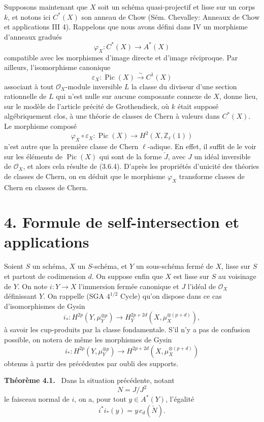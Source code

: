 \documentclass[11pt]{article}
\newenvironment{statement}[1]{\par\medskip\noindent\textbf{#1.}\ }{\par\medskip}
\providecommand{\Pic}{\operatorname{Pic}}
\begin{document}
Supposons maintenant que $X$ soit un schéma quasi-projectif et lisse sur un corps $k$, et notons ici $C^*(X)$ son anneau de Chow (Sém. Chevalley: Anneaux de Chow et applications III 4). Rappelons que nous avons défini dans IV un morphisme d'anneaux gradués
\[
\varphi_X:C^*(X)\to A^*(X)
\]
compatible avec les morphismes d'image directe et d'image réciproque. Par ailleurs, l'isomorphisme canonique
\[
\varepsilon_X:\Pic(X)\xrightarrow{\sim} C^1(X)
\]
associant à tout $\mathcal O_X$-module inversible $L$ la classe du diviseur d'une section rationnelle de $L$ qui n'est nulle sur aucune composante connexe de $X$, donne lieu, sur le modèle de l'article précité de Grothendieck, où $k$ était supposé algébriquement clos, à une théorie de classes de Chern à valeurs dans $C^*(X)$. Le morphisme composé
\[
\varphi_X\circ\varepsilon_X:\Pic(X)\longrightarrow H^2(X,\mathbb Z_\ell(1))
\]
n'est autre que la première classe de Chern $\ell$-adique. En effet, il suffit de le voir sur les éléments de $\Pic(X)$ qui sont de la forme $\check J$, avec $J$ un idéal inversible de $\mathcal O_X$, et alors cela résulte de (3.6.4). D'après les propriétés d'unicité des théories de classes de Chern, on en déduit que le morphisme $\varphi_X$ transforme classes de Chern en classes de Chern.

\section*{4. Formule de self-intersection et applications}

Soient $S$ un schéma, $X$ un $S$-schéma, et $Y$ un sous-schéma fermé de $X$, lisse sur $S$ et partout de codimension $d$. On suppose enfin que $X$ est lisse sur $S$ au voisinage de $Y$. On note $i:Y\to X$ l'immersion fermée canonique et $J$ l'idéal de $\mathcal O_X$ définissant $Y$. On rappelle (SGA $4^{1/2}$ Cycle) qu'on dispose dans ce cas d'isomorphismes de Gysin
\[
i_*:H^{2p}(Y,\mu_Y^{\otimes p})
\to H_Y^{2p+2d}(X,\mu_X^{\otimes(p+d)}),
\]
à savoir les cup-produits par la classe fondamentale. S'il n'y a pas de confusion possible, on notera de même les morphismes de Gysin
\[
i_*:H^{2p}(Y,\mu_Y^{\otimes p})
\to H^{2p+2d}(X,\mu_X^{\otimes(p+d)})
\]
obtenus à partir des précédentes par oubli des supports.

\begin{statement}{Théorème 4.1}
Dans la situation précédente, notant
\[
N=J/J^2
\]
le faisceau normal de $i$, on a, pour tout $y\in A^*(Y)$, l'égalité
\[
i^*i_*(y)=y\,c_d(\check N).
\]
\end{statement}
\end{document}
